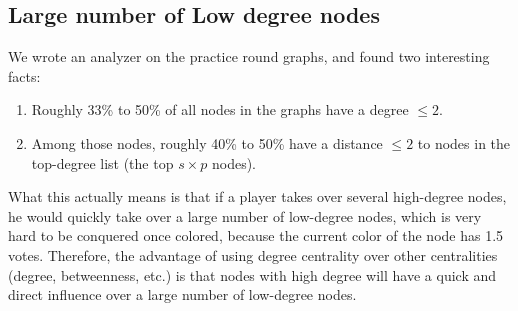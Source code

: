 \documentclass[12pt]{article}
\begin{document}
\subsection{Large number of Low degree nodes}
We wrote an analyzer on the practice round graphs, and found two interesting facts:
\begin{enumerate}
\item Roughly 33\% to 50\% of all nodes in the graphs have a degree $\leq 2$. 
\item Among those nodes, roughly 40\% to 50\% have a distance $\leq 2$ to nodes in the top-degree list (the top $s \times p$ nodes). 
\end{enumerate}
What this actually means is that if a player takes over several high-degree nodes, he would quickly take over a large number of low-degree nodes, which is very hard to be conquered once colored, because the current color of the node has 1.5 votes. Therefore, the advantage of using degree centrality over other centralities (degree, betweenness, etc.) is that nodes with high degree will have a quick and direct influence over a large number of low-degree nodes. 
\end{document}
